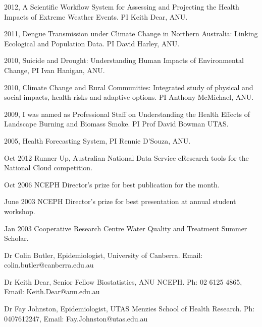 \documentclass[a4paper,11pt]{article}
\begin{document}
\medskip
\renewcommand{\labelenumi}{\textsc{k}\theenumi.}
\begin{revnumerate}
\item 2012, A Scientific Workflow System for Assessing and Projecting the Health Impacts of Extreme Weather Events. PI Keith Dear, ANU.	
\item 2011, Dengue Transmission under Climate Change in Northern Australia: Linking Ecological and Population Data. PI David Harley, ANU.	
\item 2010, Suicide and Drought: Understanding Human Impacts of Environmental Change, PI Ivan Hanigan, ANU.	
\item 2010, Climate Change and Rural Communities: Integrated study of physical and social impacts, health risks and adaptive options. PI Anthony McMichael, ANU. 	
\item 2009, I was named as Professional Staff on Understanding the Health Effects of Landscape Burning and Biomass Smoke. PI Prof David Bowman UTAS. 	
\item 2005, Health Forecasting System,	PI Rennie D'Souza, ANU.

\end{revnumerate}

\medskip  
\begin{revnumerate}
\item Oct 2012 Runner Up, Australian National Data Service eResearch tools for the National Cloud competition.

\item Oct 2006 NCEPH Director’s prize for best publication for the month.

\item June 2003 NCEPH Director’s prize for best presentation at annual student workshop.

\item Jan 2003 Cooperative Research Centre Water Quality and Treatment Summer Scholar.
\end{revnumerate}
\bigskip 


\medskip

\medskip
\renewcommand{\labelenumi}{\textsc{l}\theenumi.}
\begin{revnumerate}

\item Dr Colin Butler, Epidemiologist, University of Canberra.   Email: colin.butler@canberra.edu.au

\item Dr Keith Dear, Senior Fellow Biostatistics, ANU NCEPH.  Ph: 02 6125 4865, Email: Keith.Dear@anu.edu.au

\item Dr Fay Johnston, Epidemiologist, UTAS Menzies School of Health Research. Ph: 0407612247, Email: Fay.Johnston@utas.edu.au
\end{revnumerate}
\end{document}

